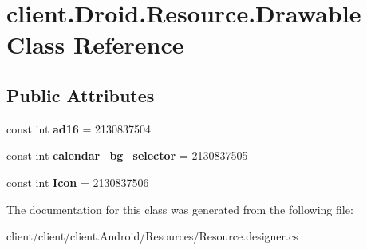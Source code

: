 \hypertarget{classclient_1_1Droid_1_1Resource_1_1Drawable}{\section{client.\-Droid.\-Resource.\-Drawable Class Reference}
\label{classclient_1_1Droid_1_1Resource_1_1Drawable}
}
\subsection*{Public Attributes}
\begin{DoxyCompactItemize}
\item 
\hypertarget{classclient_1_1Droid_1_1Resource_1_1Drawable_a0af238431d23f563312001ca3a7f9e3c}{const int {\bfseries ad16} = 2130837504}\label{classclient_1_1Droid_1_1Resource_1_1Drawable_a0af238431d23f563312001ca3a7f9e3c}

\item 
\hypertarget{classclient_1_1Droid_1_1Resource_1_1Drawable_ae7440315d4b949cbd2a052d77a7e238e}{const int {\bfseries calendar\-\_\-bg\-\_\-selector} = 2130837505}\label{classclient_1_1Droid_1_1Resource_1_1Drawable_ae7440315d4b949cbd2a052d77a7e238e}

\item 
\hypertarget{classclient_1_1Droid_1_1Resource_1_1Drawable_a13031544b000add228628786d4b0da81}{const int {\bfseries Icon} = 2130837506}\label{classclient_1_1Droid_1_1Resource_1_1Drawable_a13031544b000add228628786d4b0da81}

\end{DoxyCompactItemize}


The documentation for this class was generated from the following file\-:\begin{DoxyCompactItemize}
\item 
client/client/client.\-Android/\-Resources/Resource.\-designer.\-cs\end{DoxyCompactItemize}
